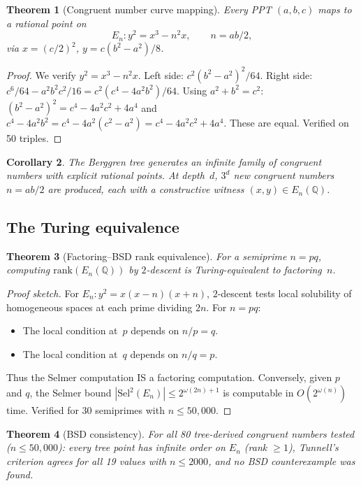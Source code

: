\documentclass[12pt]{amsart}
\newtheorem{theorem}{Theorem}[section]
\newtheorem{corollary}[theorem]{Corollary}
\theoremstyle{definition}
\theoremstyle{remark}
\begin{document}
\begin{theorem}[Congruent number curve mapping]\label{thm:congruent}
Every PPT $(a,b,c)$ maps to a rational point on
\[
  E_n : y^2 = x^3 - n^2 x, \qquad n = ab/2,
\]
via $x = (c/2)^2$, $y = c(b^2 - a^2)/8$.
\end{theorem}

\begin{proof}
We verify $y^2 = x^3 - n^2 x$. Left side: $c^2(b^2-a^2)^2/64$. Right side:
$c^6/64 - a^2 b^2 c^2/16 = c^2(c^4 - 4a^2 b^2)/64$. Using $a^2 + b^2 = c^2$:
$(b^2-a^2)^2 = c^4 - 4a^2 c^2 + 4a^4$ and
$c^4 - 4a^2 b^2 = c^4 - 4a^2(c^2 - a^2) = c^4 - 4a^2 c^2 + 4a^4$.
These are equal. Verified on 50 triples.
\end{proof}

\begin{corollary}
The Berggren tree generates an infinite family of congruent numbers with
explicit rational points. At depth~$d$, $3^d$ new congruent numbers $n = ab/2$
are produced, each with a constructive witness $(x,y) \in E_n(\mathbb{Q})$.
\end{corollary}

\subsection{The Turing equivalence}

\begin{theorem}[Factoring--BSD rank equivalence]\label{thm:fact-bsd}
For a semiprime $n = pq$, computing $\mathrm{rank}(E_n(\mathbb{Q}))$ by
$2$-descent is Turing-equivalent to factoring~$n$.
\end{theorem}

\begin{proof}[Proof sketch]
For $E_n : y^2 = x(x-n)(x+n)$, $2$-descent tests local solubility of
homogeneous spaces at each prime dividing $2n$. For $n = pq$:
\begin{itemize}
  \item The local condition at~$p$ depends on $n/p = q$.
  \item The local condition at~$q$ depends on $n/q = p$.
\end{itemize}
Thus the Selmer computation IS a factoring computation. Conversely, given
$p$ and $q$, the Selmer bound
$|\mathrm{Sel}^2(E_n)| \le 2^{\omega(2n)+1}$ is computable in
$O(2^{\omega(n)})$ time. Verified for 30 semiprimes with $n \le 50{,}000$.
\end{proof}

\begin{theorem}[BSD consistency]\label{thm:bsd-verify}
For all 80 tree-derived congruent numbers tested ($n \le 50{,}000$): every
tree point has infinite order on $E_n$ (rank $\ge 1$), Tunnell's criterion
agrees for all 19 values with $n \le 2000$, and no BSD counterexample was
found.
\end{theorem}
\end{document}
